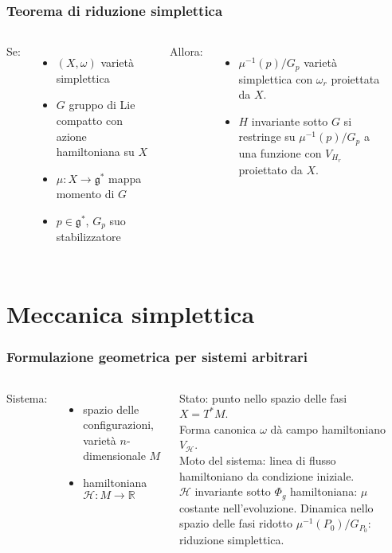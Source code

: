 \documentclass[]{beamer}
\newcommand{\R}{\mathbb{R}}
\begin{document}
\begin{frame}
  \frametitle{Teorema di riduzione simplettica}
  \begin{columns}
    Se:
    \begin{itemize}
      \item $(X, \omega)$ varietà simplettica
      \item $G$ gruppo di Lie compatto con azione hamiltoniana su $X$
      \item $\mu: X \to \mathfrak{g}^*$ mappa momento di $G$
      \item $p \in \mathfrak{g^*}$, $G_p$ suo stabilizzatore
    \end{itemize}
    Allora:
    \begin{itemize}
      \item $\mu^{-1}(p)/G_p$ varietà simplettica con $\omega_r$ proiettata da $X$.
      \item $H$ invariante sotto $G$ si restringe su $\mu^{-1}(p)/G_p$ a una funzione con $V_{H_r}$ proiettato da $X$.
    \end{itemize}
      \begin{center}
            
      \end{center}
  \end{columns}
  \end{frame}

\section{Meccanica simplettica}

\begin{frame}
\frametitle{Formulazione geometrica per sistemi arbitrari}
\begin{columns}
  Sistema: 
  \begin{itemize}
    \item {spazio delle configurazioni}, varietà $n$-dimensionale $M$
    \item {hamiltoniana} $\mathcal{H}: M\to \R$
  \end{itemize}
  {Stato}: punto nello {spazio delle fasi} $X = T^* M$.\\ 
  {Forma canonica} $\omega$ dà {campo hamiltoniano} $V_{\mathcal{H}}$.\\[5pt]
  \alert{Moto del sistema: linea di flusso hamiltoniano da condizione iniziale.}\\[5pt]
  $\mathcal{H}$ invariante sotto $\Phi_g$ hamiltoniana: $\mu$ costante nell'evoluzione. Dinamica nello spazio delle fasi ridotto $\mu^{-1}(P_0)/G_{P_0}$: riduzione simplettica. 
    \begin{center}
          
    \end{center}
\end{columns}
\end{frame}
\end{document}
